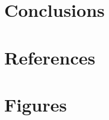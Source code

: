 \documentclass[preprint,review,12pt]{elsarticle}
\begin{document}


\section{Conclusions}


\section{References}

 


\section{Figures}
\end{document}
